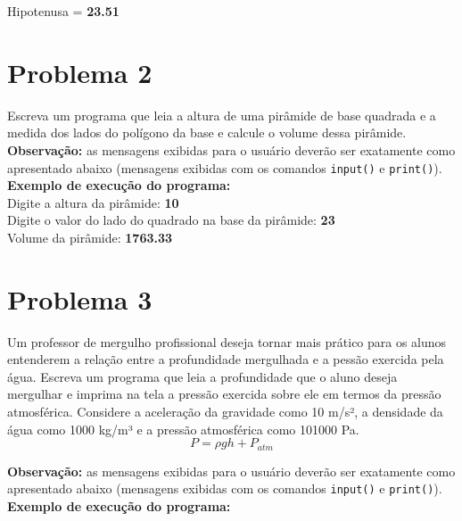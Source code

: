 \documentclass[paper=a4, fontsize=11pt]{scrartcl} %
\numberwithin{equation}{section} %
\numberwithin{figure}{section} %
\numberwithin{table}{section} %
\begin{document}
Hipotenusa = \textbf{23.51} \\




\section*{Problema 2}

Escreva um programa que leia a altura de uma pirâmide de base quadrada e a medida dos lados do polígono da base e calcule o volume dessa pirâmide.\\

\textbf{Observação:} as mensagens exibidas para o usuário deverão ser exatamente como apresentado abaixo (mensagens exibidas com os comandos \texttt{input()} e \texttt{print()}).\\

\textbf{Exemplo de execução do programa:}\\

Digite a altura da pirâmide: \textbf{10} \\
Digite o valor do lado do quadrado na base da pirâmide: \textbf{23} \\

Volume da pirâmide: \textbf{1763.33} \\


\section*{Problema 3}

Um professor de mergulho profissional deseja tornar mais prático para os alunos entenderem a relação entre a profundidade mergulhada e a pessão exercida pela água. Escreva um programa que leia a profundidade que o aluno deseja mergulhar e imprima na tela a pressão exercida sobre ele em termos da pressão atmosférica. Considere a aceleração da gravidade como 10 m/s², a densidade da água como 1000 kg/m³ e a pressão atmosférica como 101000 Pa.\\

\begin{equation*}
    P = \rho g h + P_{atm}
\end{equation*}

\textbf{Observação:} as mensagens exibidas para o usuário deverão ser exatamente como apresentado abaixo (mensagens exibidas com os comandos \texttt{input()} e \texttt{print()}).\\

\textbf{Exemplo de execução do programa:}\\
\end{document}
